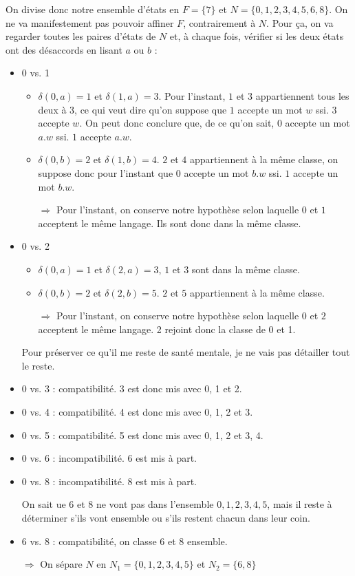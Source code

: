 \begin{correction*}


On divise donc notre ensemble d'états en $F = \{7\}$ et $N = \{0,1,2,3,4,5,6,8\}$. On ne va manifestement pas pouvoir affiner $F$, contrairement à $N$. Pour ça, on va regarder toutes les paires d'états de $N$ et, à chaque fois, vérifier si les deux états ont des désaccords en lisant $a$ ou $b$ :

\begin{itemize}
\item 0 vs. 1
\begin{itemize}
\item $\delta(0,a) = 1$ et $\delta(1,a) = 3$. Pour l'instant, $1$ et $3$ appartiennent tous les deux à $3$, ce qui veut dire qu'on suppose que $1$ accepte un mot $w$ ssi. $3$ accepte $w$. On peut donc conclure que, de ce qu'on sait, $0$ accepte un mot $a.w$ ssi. $1$ accepte $a.w$.
\item $\delta(0,b) = 2$ et $\delta(1,b) = 4$. $2$ et $4$ appartiennent à la même classe, on suppose donc pour l'instant que $0$ accepte un mot $b.w$ ssi. $1$ accepte un mot $b.w$.
\item[$\Rightarrow$] Pour l'instant, on conserve notre hypothèse selon laquelle $0$ et $1$ acceptent le même langage. Ils sont donc dans la même classe.
\end{itemize}
\item 0 vs. 2
\begin{itemize}
\item $\delta(0,a) = 1$ et $\delta(2,a) = 3$, $1$ et $3$ sont dans la même classe.
\item $\delta(0,b) = 2$ et $\delta(2,b) = 5$. $2$ et $5$ appartiennent à la même classe.
\item[$\Rightarrow$] Pour l'instant, on conserve notre hypothèse selon laquelle $0$ et $2$ acceptent le même langage. 2 rejoint donc la classe de 0 et 1.
\end{itemize}
\item[] Pour préserver ce qu'il me reste de santé mentale, je ne vais pas détailler tout le reste.
\item 0 vs. 3 : compatibilité. 3 est donc mis avec 0, 1 et 2.
\item 0 vs. 4 : compatibilité. 4 est donc mis avec 0, 1, 2 et 3.
\item 0 vs. 5 : compatibilité. 5 est donc mis avec 0, 1, 2 et 3, 4.
\item 0 vs. 6 : incompatibilité. 6 est mis à part.
\item 0 vs. 8 : incompatibilité. 8 est mis à part.
\item[] On sait ue 6 et 8 ne vont pas dans l'ensemble $0,1,2,3,4,5$, mais il reste à déterminer s'ils vont ensemble ou s'ils restent chacun dans leur coin.
\item 6 vs. 8 : compatibilité, on classe $6$ et $8$ ensemble.
\item[$\Rightarrow$] On sépare $N$ en $N_1 = \{0,1,2,3,4,5\}$ et $N_2 = \{6,8\}$
\end{itemize}


\end{correction*}
